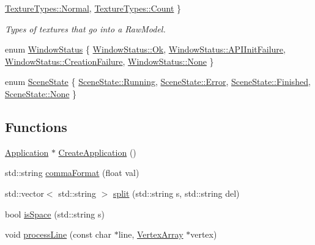 \begin{DoxyCompactItemize}
\hyperlink{namespacepcs_aff33aa4c1c94147ad9ade12bc60958d4a960b44c579bc2f6818d2daaf9e4c16f0}{Texture\+Types\+::\+Normal}, 
\hyperlink{namespacepcs_aff33aa4c1c94147ad9ade12bc60958d4ae93f994f01c537c4e2f7d8528c3eb5e9}{Texture\+Types\+::\+Count}
 \}\begin{DoxyCompactList}\small\item\em Types of textures that go into a Raw\+Model. \end{DoxyCompactList}
\item 
enum \hyperlink{namespacepcs_adf26ca2cc1c5124ff4f4ba4d6ff8710b}{Window\+Status} \{ \hyperlink{namespacepcs_adf26ca2cc1c5124ff4f4ba4d6ff8710baa60852f204ed8028c1c58808b746d115}{Window\+Status\+::\+Ok}, 
\hyperlink{namespacepcs_adf26ca2cc1c5124ff4f4ba4d6ff8710ba07030299ace243caa4ac63b1720247f4}{Window\+Status\+::\+A\+P\+I\+Init\+Failure}, 
\hyperlink{namespacepcs_adf26ca2cc1c5124ff4f4ba4d6ff8710bac3d13af9c41217048e0650593a46f40e}{Window\+Status\+::\+Creation\+Failure}, 
\hyperlink{namespacepcs_adf26ca2cc1c5124ff4f4ba4d6ff8710ba6adf97f83acf6453d4a6a4b1070f3754}{Window\+Status\+::\+None}
 \}
\item 
enum \hyperlink{namespacepcs_a934a97e8e5fae498d1ab67d67531a3a4}{Scene\+State} \{ \hyperlink{namespacepcs_a934a97e8e5fae498d1ab67d67531a3a4a5bda814c4aedb126839228f1a3d92f09}{Scene\+State\+::\+Running}, 
\hyperlink{namespacepcs_a934a97e8e5fae498d1ab67d67531a3a4a902b0d55fddef6f8d651fe1035b7d4bd}{Scene\+State\+::\+Error}, 
\hyperlink{namespacepcs_a934a97e8e5fae498d1ab67d67531a3a4a8f3d10eb21bd36347c258679eba9e92b}{Scene\+State\+::\+Finished}, 
\hyperlink{namespacepcs_a934a97e8e5fae498d1ab67d67531a3a4a6adf97f83acf6453d4a6a4b1070f3754}{Scene\+State\+::\+None}
 \}
\end{DoxyCompactItemize}
\subsection*{Functions}
\begin{DoxyCompactItemize}
\item 
\hyperlink{classpcs_1_1Application}{Application} $\ast$ \hyperlink{namespacepcs_ac505f1571e4369cb8eaaca3a788979c8}{Create\+Application} ()
\item 
std\+::string \hyperlink{namespacepcs_adc528f7cec12c6ab69fbbea0ac3c7fe4}{comma\+Format} (float val)
\item 
std\+::vector$<$ std\+::string $>$ \hyperlink{namespacepcs_ae6afa19b12671174ac5dc55535ff674d}{split} (std\+::string s, std\+::string del)
\item 
bool \hyperlink{namespacepcs_aaa3406145d29fc28767406a54dbfc2f8}{is\+Space} (std\+::string s)
\item 
void \hyperlink{namespacepcs_a5246f80f28a5fa413f1ae594eb55daf9}{process\+Line} (const char $\ast$line, \hyperlink{classpcs_1_1VertexArray}{Vertex\+Array} $\ast$vertex)
\end{DoxyCompactItemize}


